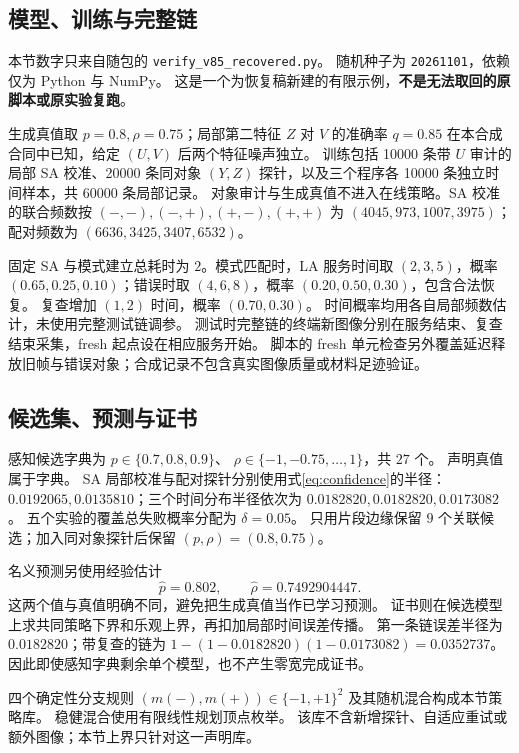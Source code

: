 \documentclass[11pt,a4paper,fontset=fandol]{ctexart}
\theoremstyle{definition}
\theoremstyle{remark}
\numberwithin{equation}{section}
\begin{document}
\subsection{模型、训练与完整链}
本节数字只来自随包的 \texttt{verify\_v85\_recovered.py}。
随机种子为 \texttt{20261101}，依赖仅为 Python 与 NumPy。
这是一个为恢复稿新建的有限示例，\textbf{不是无法取回的原脚本或原实验复跑}。

生成真值取 $p=0.8,\rho=0.75$；局部第二特征 $Z$ 对 $V$ 的准确率 $q=0.85$ 在本合成合同中已知，给定 $(U,V)$ 后两个特征噪声独立。
训练包括 10000 条带 $U$ 审计的局部 SA 校准、20000 条同对象 $(Y,Z)$ 探针，以及三个程序各 10000 条独立时间样本，共 60000 条局部记录。
对象审计与生成真值不进入在线策略。SA 校准的联合频数按 $(-,-),(-,+),(+,-),(+,+)$ 为
$(4045,973,1007,3975)$；配对频数为 $(6636,3425,3407,6532)$。

固定 SA 与模式建立总耗时为 $2$。模式匹配时，LA 服务时间取 $(2,3,5)$，概率 $(0.65,0.25,0.10)$；错误时取 $(4,6,8)$，概率 $(0.20,0.50,0.30)$，包含合法恢复。
复查增加 $(1,2)$ 时间，概率 $(0.70,0.30)$。
时间概率均用各自局部频数估计，未使用完整测试链调参。
测试时完整链的终端新图像分别在服务结束、复查结束采集，fresh 起点设在相应服务开始。
脚本的 fresh 单元检查另外覆盖延迟释放旧帧与错误对象；合成记录不包含真实图像质量或材料足迹验证。

\subsection{候选集、预测与证书}
感知候选字典为
$p\in\{0.7,0.8,0.9\}$、
$\rho\in\{-1,-0.75,\ldots,1\}$，共 $27$ 个。
声明真值属于字典。
SA 局部校准与配对探针分别使用式\eqref{eq:confidence}的半径：
$0.0192065,0.0135810$；三个时间分布半径依次为
$0.0182820,0.0182820,0.0173082$。
五个实验的覆盖总失败概率分配为 $\delta=0.05$。
只用片段边缘保留 $9$ 个关联候选；加入同对象探针后保留 $(p,\rho)=(0.8,0.75)$。

名义预测另使用经验估计
\[
 \widehat p=0.802,\qquad \widehat\rho=0.7492904447.
\]
这两个值与真值明确不同，避免把生成真值当作已学习预测。
证书则在候选模型上求共同策略下界和乐观上界，再扣加局部时间误差传播。
第一条链误差半径为 $0.0182820$；带复查的链为
$1-(1-0.0182820)(1-0.0173082)=0.0352737$。
因此即使感知字典剩余单个模型，也不产生零宽完成证书。

四个确定性分支规则 $(m(-),m(+))\in\{-1,+1\}^2$ 及其随机混合构成本节策略库。
稳健混合使用有限线性规划顶点枚举。
该库不含新增探针、自适应重试或额外图像；本节上界只针对这一声明库。
\end{document}
